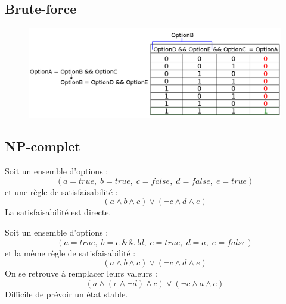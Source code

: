 \documentclass[11pt]{beamer}
\begin{document}
\subsection{Brute-force}
\begin{frame}
    \begin{figure}
        \includegraphics[scale=0.28]{img_diapo_1.png}
        \centering
    \end{figure}
\end{frame}


\subsection{NP-complet}
\begin{frame}
    Soit un ensemble d’options :\\
    \begin{equation}
        (a = true,\; b = true,\; c = false,\; d = false,\; e = true)
    \end{equation}
    et une règle de satisfaisabilité :
    \begin{equation}
        (a \land b \land c) \lor (\lnot c \land d \land e)
    \end{equation}
    La satisfaisabilité est directe.
\end{frame}

\begin{frame}
    Soit un ensemble d’options :\\
    \begin{equation}
    (a = true,\; b = e \;\&\&\; !d,\; c = true,\; d = a,\; e = false)
    \end{equation}
    et la même règle de satisfaisabilité :
    \begin{equation}
        (a \land b \land c) \lor (\lnot c \land d \land e)
    \end{equation}
    On se retrouve à remplacer leurs valeurs :
    \begin{equation}
        (a \land (e \land \lnot d) \land c) \lor (\lnot c \land a \land e)
    \end{equation}
    Difficile de prévoir un état stable.
\end{frame}
\end{document}

